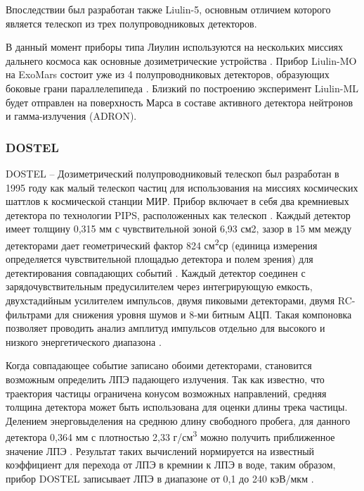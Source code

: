 Впоследствии был разработан также Liulin-5, основным отличием которого является телескоп из трех полупроводниковых детекторов.

В данный момент приборы типа Лиулин используются на нескольких миссиях дальнего космоса как основные дозиметрические устройства \cite{Dachev2015}. Прибор Liulin-MO на ExoMars состоит уже из 4 полупроводниковых детекторов, образующих  боковые грани параллелепипеда \cite{Semkova2015}. Близкий по построению эксперимент Liulin-ML будет отправлен на поверхность Марса в составе активного детектора нейтронов и гамма-излучения (ADRON).

\subsubsection{DOSTEL}

DOSTEL -- Дозиметрический полупроводниковый телескоп был разработан в 1995 году как малый телескоп частиц для использования на миссиях космических шаттлов к космической станции МИР. Прибор включает в себя два кремниевых детектора по технологии PIPS, расположенных как телескоп \cite{Beaujean2002}. Каждый детектор имеет толщину 0,315 мм с чувствительной зоной 6,93 см2, зазор в 15 мм между детекторами дает геометрический фактор 824 см\textsuperscript{2}ср (единица измерения определяется чувствительной площадью детектора и полем зрения) для детектирования совпадающих событий \cite{Beaujean2002}. Каждый детектор соединен с зарядочувствительным предусилителем через интегрирующую емкость, двухстадийным усилителем импульсов, двумя пиковыми детекторами, двумя RC-фильтрами для снижения уровня шумов и 8-ми битным АЦП. Такая компоновка позволяет проводить анализ амплитуд импульсов отдельно для высокого и низкого энергетического диапазона \cite{Beaujean2002}.


Когда совпадающее событие записано обоими детекторами, становится возможным определить ЛПЭ падающего излучения. Так как известно, что траектория частицы ограничена конусом возможных направлений, средняя толщина детектора может быть использована для оценки длины трека частицы. Делением энерговыделения на среднюю длину свободного пробега, для данного детектора 0,364 мм \cite{Beaujean2002} с плотностью 2,33 г/см\textsuperscript{3} можно получить приближенное значение ЛПЭ \cite{knoll2000radiation}. Результат таких вычислений нормируется на известный коэффициент для перехода от ЛПЭ в кремнии к ЛПЭ в воде, таким образом, прибор DOSTEL записывает ЛПЭ в диапазоне от 0,1 до 240 кэВ/мкм \cite{Beaujean2002}.

